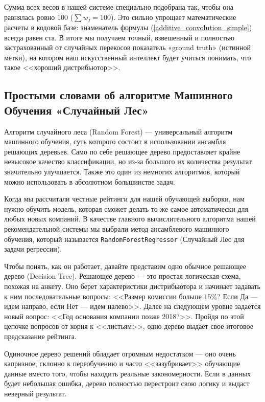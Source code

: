 \documentclass[14pt, a4paper]{extarticle}
\begin{document}
Сумма всех весов в нашей системе специально подобрана так, чтобы она равнялась ровно 100 ($\sum w_j = 100$). Это сильно упрощает математические расчеты в кодовой базе: знаменатель формулы (\ref{additive_convolution_simple}) всегда равен ста. В итоге мы получаем точный, взвешенный и полностью застрахованный от случайных перекосов показатель «ground truth» (истинной метки), на котором наш искусственный интеллект будет учиться понимать, что такое <<хороший дистрибьютор>>.

\subsection{Простыми словами об алгоритме Машинного Обучения «Случайный Лес»}
Алгоритм случайного леса (Random Forest) — универсальный алгоритм машинного обучения, суть которого состоит в использовании ансамбля решающих деревьев. Само по себе решающее дерево предоставляет крайне невысокое качество классификации, но из-за большого их количества результат значительно улучшается. Также это один из немногих алгоритмов, который можно использовать в абсолютном большинстве задач.

Когда мы рассчитали честные рейтинги для нашей обучающей выборки, нам нужно обучить модель, которая сможет делать то же самое автоматически для любых новых компаний. В качестве главного вычислительного алгоритма нашей рекомендательной системы мы выбрали метод ансамблевого машинного обучения, который называется \texttt{RandomForestRegressor} (Случайный Лес для задачи регрессии). 

Чтобы понять, как он работает, давайте представим одно обычное решающее дерево (Decision Tree). Решающее дерево — это простая логическая схема, похожая на анкету. Оно берет характеристики дистрибьютора и начинает задавать к ним последовательные вопросы: <<Размер комиссии больше $15\%$? Если Да — идем направо, если Нет — идем налево>>. Далее на следующем уровне задается новый вопрос: <<Год основания компании позже 2018?>>. Пройдя по этой цепочке вопросов от корня к <<листьям>>, одно дерево выдает свое итоговое предсказание рейтинга.

Одиночное дерево решений обладает огромным недостатком — оно очень капризное, склонно к переобучению и часто <<зазубривает>> обучающие данные вместо того, чтобы находить реальные закономерности. Если в данных будет небольшая ошибка, дерево полностью перестроит свою логику и выдаст неверный результат.
\end{document}
